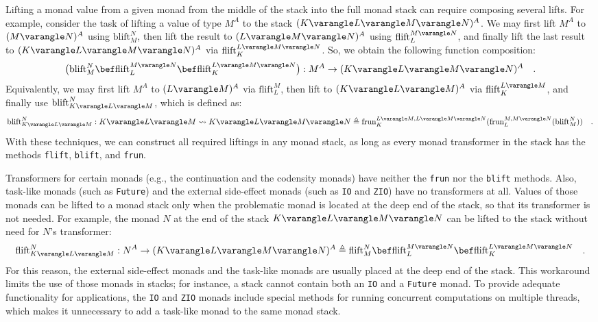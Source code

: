 Lifting a monad value from a given monad from the middle of the stack
into the full monad stack can require composing several lifts. For
example, consider the task of lifting a value of type $M^{A}$ to
the stack $(K\varangle L\varangle M\varangle N)^{A}$. We may first
lift $M^{A}$ to $(M\varangle N)^{A}$ using $\text{blift}_{M}^{N}$,
then lift the result to $(L\varangle M\varangle N)^{A}$ using $\text{flift}_{L}^{M\varangle N}$,
and finally lift the last result to $(K\varangle L\varangle M\varangle N)^{A}$
via $\text{flift}_{K}^{L\varangle M\varangle N}$. So, we obtain the
following function composition:
\[
\big(\text{blift}_{M}^{N}\bef\text{flift}_{L}^{M\varangle N}\bef\text{flift}_{K}^{L\varangle M\varangle N}\big):M^{A}\rightarrow(K\varangle L\varangle M\varangle N)^{A}\quad.
\]
Equivalently, we may first lift $M^{A}$ to $(L\varangle M)^{A}$
via $\text{flift}_{L}^{M}$, then lift to $(K\varangle L\varangle M)^{A}$
via $\text{flift}_{K}^{L\varangle M}$, and finally use $\text{blift}_{K\varangle L\varangle M}^{N}$,
which is defined as:
\[
\text{blift}_{K\varangle L\varangle M}^{N}:K\varangle L\varangle M\leadsto K\varangle L\varangle M\varangle N\triangleq\text{frun}_{K}^{L\varangle M,L\varangle M\varangle N}(\text{frun}_{L}^{M,M\varangle N}(\text{blift}_{M}^{N}))\quad.
\]
With these techniques, we can construct all required liftings in any
monad stack, as long as every monad transformer in the stack has the
methods \lstinline!flift!, \lstinline!blift!, and \lstinline!frun!.

Transformers for certain monads (e.g., the continuation and the codensity
monads) have neither the \lstinline!frun! nor the \lstinline!blift!
methods. Also, task-like monads (such as \lstinline!Future!) and
the external side-effect monads (such as \lstinline!IO! and \lstinline!ZIO!)
have no transformers at all. Values of those monads can be lifted
to a monad stack only when the problematic monad is located at the
deep end of the stack, so that its transformer is not needed. For
example, the monad $N$ at the end of the stack $K\varangle L\varangle M\varangle N$
can be lifted to the stack without need for $N$\textsf{'}s transformer:
\[
\text{flift}_{K\varangle L\varangle M}^{N}:N^{A}\rightarrow(K\varangle L\varangle M\varangle N)^{A}\triangleq\text{flift}_{M}^{N}\bef\text{flift}_{L}^{M\varangle N}\bef\text{flift}_{K}^{L\varangle M\varangle N}\quad.
\]
For this reason, the external side-effect monads and the task-like
monads are usually placed at the deep end of the stack. This workaround
limits the use of those monads in stacks; for instance, a stack cannot
contain both an \lstinline!IO! and a \lstinline!Future! monad. To
provide adequate functionality for applications, the \lstinline!IO!
and \lstinline!ZIO! monads include special methods for running concurrent
computations on multiple threads, which makes it unnecessary to add
a task-like monad to the same monad stack.


